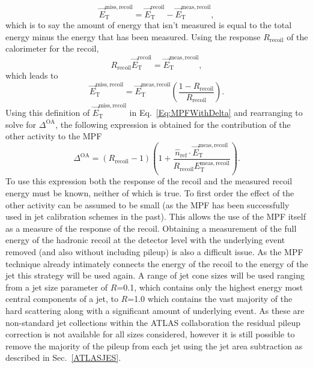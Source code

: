 \begin{equation}
  \vec{E}_{\mathrm T}^{\mathrm{miss, recoil}} = \vec{E}_{\mathrm T}^{\mathrm{recoil}} - \vec{E}_{\mathrm T}^{\mathrm{meas, recoil}}, 
\end{equation}
\noindent 
which is to say the amount of energy that isn't measured is equal to the total energy minus the energy that has been measured.  
Using the response $R_{\mathrm{recoil}}$ of the calorimeter for the recoil, 
\begin{equation}
  R_{\mathrm{recoil}}\vec{E}_{\mathrm T}^{\mathrm{recoil}} = \vec{E}_{\mathrm T}^{\mathrm{meas, recoil}}, 
\end{equation}
\noindent
which leads to 
\begin{equation}
  \vec{E}_{\mathrm T}^{\mathrm{miss, recoil}} = \vec{E}_{\mathrm T}^{\mathrm{meas, recoil}}\left(\frac{1-R_{\mathrm{recoil}}}{R_{\mathrm{recoil}}}\right).  
\end{equation}
\noindent
Using this definition of $\vec{E}_{\mathrm T}^{\mathrm{miss, recoil}}$ in Eq.~\ref{Eq:MPFWithDelta} and rearranging to solve for $\Delta^{\mathrm{OA}}$, the following expression is obtained for the contribution of the other activity to the MPF 
\begin{equation}
  \Delta^{\mathrm{OA}}=\left(R_{\mathrm{recoil}}-1\right)\left(1+\frac{\hat n_{\mathrm{ref}}\cdot \vec{E}_{\mathrm T}^{\mathrm{meas, recoil}}}{R_{\mathrm{recoil}}{E}_{\mathrm T}^{\mathrm{meas, recoil}}}\right).  
\end{equation} 
To use this expression both the response of the recoil and the measured recoil energy must be known, neither of which is true.  
To first order the effect of the other activity can be assumed to be small (as the MPF has been successfully used in jet calibration schemes in the past).  
This allows the use of the MPF itself as a measure of the response of the recoil.  
Obtaining a measurement of the full energy of the hadronic recoil at the detector level with the underlying event removed (and also without including pileup) is also a difficult issue.  
As the MPF technique already intimately connects the energy of the recoil to the energy of the jet this strategy will be used again.  
A range of jet cone sizes will be used ranging from a jet size parameter of $R$=0.1, which contains only the highest energy most central components of a jet, to $R$=1.0 which contains the vast majority of the hard scattering along with a significant amount of underlying event.   
As these are non-standard jet collections within the ATLAS collaboration the residual pileup correction is not available for all sizes considered, however it is still possible to remove the majority of the pileup from each jet using the jet area subtraction as described in Sec.~\ref{ATLASJES}.  





